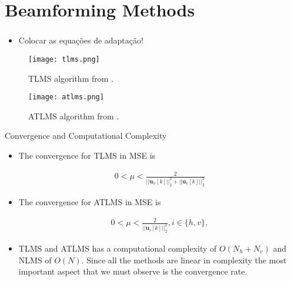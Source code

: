 \documentclass[10pt]{beamer}
\begin{document}
\section{Beamforming Methods}
\begin{frame}[allowframebreaks]
    \frametitle{\insertsection}
    \begin{itemize}
        
        \item Colocar as equações de adaptação!
    
    \end{itemize}
    \framebreak
    \begin{figure}
        \centering 
        \texttt{[image: tlms.png]}
        \caption{TLMS algorithm from \cite{ribeiroseparable}.}
        \label{fig:lms_alg} 
    \end{figure}
    \begin{figure}
        \centering
        \texttt{[image: atlms.png]}
        \caption{ATLMS algorithm from \cite{ribeiroseparable}.}
        \label{fig:atlms_alg} 
    \end{figure}
    \begin{block}{Convergence and Computational Complexity}
        \begin{itemize}
            \justifying
            \item The convergence for TLMS in MSE is
            
                \begin{align}
                    0 < \mu < \frac{2}{\left|\left|\boldsymbol{u}_{h}[k]\right|\right|^{2}_{2} + \left|\left|\boldsymbol{u}_{v}[k]\right|\right|^{2}_{2}}
                \end{align}
            
            \item The convergence for ATLMS in MSE is
            
                \begin{align}
                    0 < \mu < \frac{2}{\left|\left|\boldsymbol{u}_{i}[k]\right|\right|^{2}_{2}}, i \in \{h,v\},
                \end{align}
            
            \item TLMS and ATLMS has a computational complexity of $O(N_{h} + N_{v})$ and NLMS of $O(N)$. Since all the methods are linear in complexity
            the most important aspect that we must observe is the convergence rate.

        \end{itemize}
    \end{block}
\end{frame}
\end{document}
